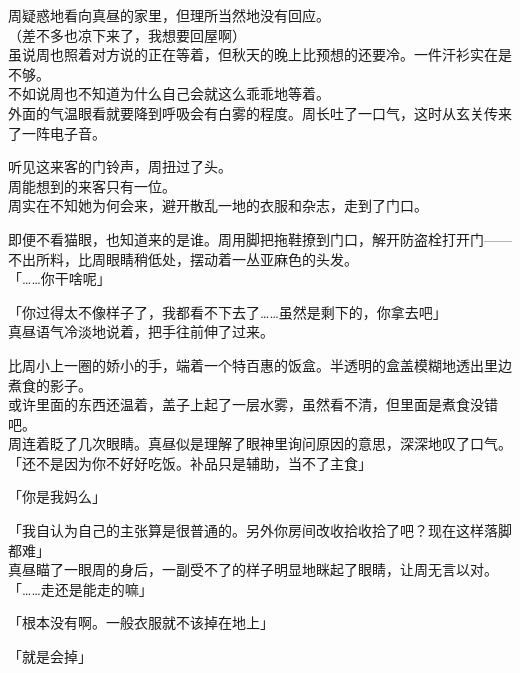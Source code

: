 周疑惑地看向真昼的家里，但理所当然地没有回应。\\

（差不多也凉下来了，我想要回屋啊）\\

虽说周也照着对方说的正在等着，但秋天的晚上比预想的还要冷。一件汗衫实在是不够。\\

不如说周也不知道为什么自己会就这么乖乖地等着。\\

外面的气温眼看就要降到呼吸会有白雾的程度。周长吐了一口气，这时从玄关传来了一阵电子音。

听见这来客的门铃声，周扭过了头。\\

周能想到的来客只有一位。\\

周实在不知她为何会来，避开散乱一地的衣服和杂志，走到了门口。

即便不看猫眼，也知道来的是谁。周用脚把拖鞋撩到门口，解开防盗栓打开门——不出所料，比周眼睛稍低处，摆动着一丛亚麻色的头发。\\

「……你干啥呢」

「你过得太不像样子了，我都看不下去了……虽然是剩下的，你拿去吧」\\

真昼语气冷淡地说着，把手往前伸了过来。

比周小上一圈的娇小的手，端着一个特百惠的饭盒。半透明的盒盖模糊地透出里边煮食的影子。\\

或许里面的东西还温着，盖子上起了一层水雾，虽然看不清，但里面是煮食没错吧。\\

周连着眨了几次眼睛。真昼似是理解了眼神里询问原因的意思，深深地叹了口气。\\

「还不是因为你不好好吃饭。补品只是辅助，当不了主食」

「你是我妈么」

「我自认为自己的主张算是很普通的。另外你房间改收拾收拾了吧？现在这样落脚都难」\\

真昼瞄了一眼周的身后，一副受不了的样子明显地眯起了眼睛，让周无言以对。\\

「……走还是能走的嘛」

「根本没有啊。一般衣服就不该掉在地上」

「就是会掉」

